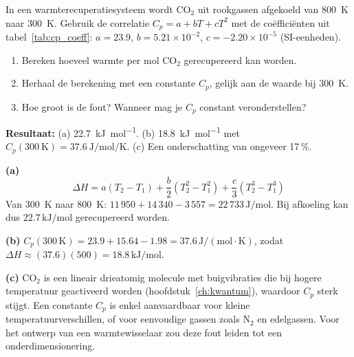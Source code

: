 \begin{oefening}
In een warmterecuperatiesysteem wordt $\mathrm{CO_2}$ uit rookgassen afgekoeld van \SI{800}{\kelvin} naar \SI{300}{\kelvin}. Gebruik de correlatie $C_p = a + bT + cT^2$ met de co\"effici\"enten uit tabel~\ref{tab:cp_coeff}: $a = 23.9$, $b = 5.21\times10^{-2}$, $c = -2.20\times10^{-5}$ (SI-eenheden).
\begin{enumerate}
\item[(a)] Bereken hoeveel warmte per mol $\mathrm{CO_2}$ gerecupereerd kan worden.
\item[(b)] Herhaal de berekening met een constante $C_p$, gelijk aan de waarde bij \SI{300}{\kelvin}.
\item[(c)] Hoe groot is de fout? Wanneer mag je $C_p$ constant veronderstellen?
\end{enumerate}
\end{oefening}
\begin{oplossing}
\textbf{Resultaat:} (a) \SI{22.7}{\kilo\joule\per\mole}. (b) \SI{18.8}{\kilo\joule\per\mole} met $C_p(\SI{300}{\kelvin}) = \SI{37.6}{\joule\per\mole\per\kelvin}$. (c) Een onderschatting van ongeveer 17\,\%.

\textbf{(a)}
\[
\Delta H = a(T_2-T_1) + \frac{b}{2}(T_2^2-T_1^2) + \frac{c}{3}(T_2^3-T_1^3)
\]
Van 300~K naar 800~K: $11\,950 + 14\,340 - 3\,557 = 22\,733\,\mathrm{J/mol}$. Bij afkoeling kan dus $22.7\,\mathrm{kJ/mol}$ gerecupereerd worden.

\textbf{(b)} $C_p(300\,\mathrm{K}) = 23.9 + 15.64 - 1.98 = 37.6\,\mathrm{J/(mol\cdot K)}$, zodat $\Delta H \approx (37.6)(500) = 18.8\,\mathrm{kJ/mol}$.

\textbf{(c)} $\mathrm{CO_2}$ is een lineair drieatomig molecule met buigvibraties die bij hogere temperatuur geactiveerd worden (hoofdstuk~\ref{ch:kwantum}), waardoor $C_p$ sterk stijgt. Een constante $C_p$ is enkel aanvaardbaar voor kleine temperatuurverschillen, of voor eenvoudige gassen zoals $\mathrm{N_2}$ en edelgassen. Voor het ontwerp van een warmtewisselaar zou deze fout leiden tot een onderdimensionering.
\end{oplossing}

